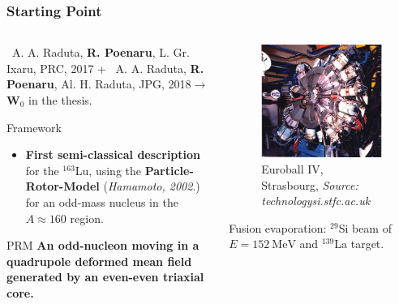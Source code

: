 \documentclass{beamer}
\begin{document}
\begin{frame}
	\frametitle{Starting Point}
	\begin{columns}
		\begin{column}{0.6\textwidth}
			{\footnotesize \faFile\ A. A. Raduta, \textbf{R. Poenaru}, L. Gr. Ixaru, PRC, 2017} + {\footnotesize \faFile\ A. A. Raduta, \textbf{R. Poenaru}, Al. H. Raduta, JPG, 2018}$\to${\footnotesize $\mathbf{W}_0$ in the thesis.}
			\begin{exampleblock}{Framework}
				\begin{itemize}
					\item \textbf{First semi-classical description} for the $^{163}$Lu, using the \textbf{Particle-Rotor-Model} (\textit{Hamamoto, 2002}.) for an odd-mass nucleus in the $A\approx 160$ region.
				\end{itemize}
			\end{exampleblock}
			\begin{alertblock}{PRM}
				\textbf{An odd-nucleon moving in a quadrupole deformed mean field generated by an even-even triaxial core.}
			\end{alertblock}
		\end{column}
		\begin{column}{0.4\textwidth}
			\begin{figure}
				\centering
				\includegraphics[width=0.99\textwidth]{figures/euroball-4.jpg}
				{\footnotesize Euroball IV, Strasbourg, \textit{Source: technologysi.stfc.ac.uk}}
			\end{figure}
			{\footnotesize Fusion evaporation: $^{29}$Si beam of $E=152\ \text{MeV}$ and $^{139}$La target.}
		\end{column}
	\end{columns}
\end{frame}
\end{document}
